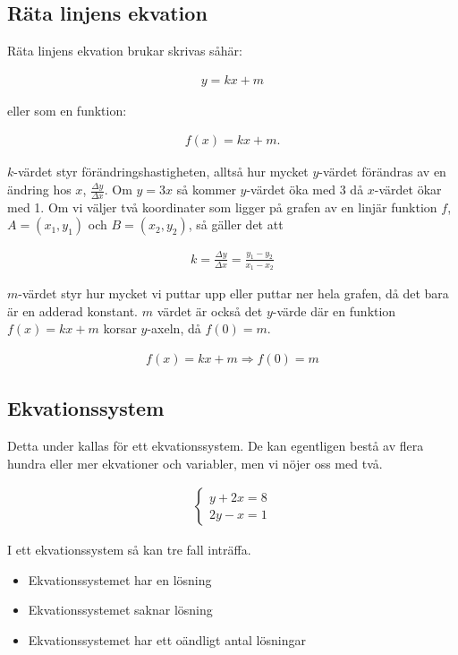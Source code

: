\newpage
\subsection{Räta linjens ekvation}

Räta linjens ekvation brukar skrivas såhär:

\begin{align}
	y=kx+m
\end{align}

eller som en funktion:

\begin{align}
	f(x)=kx+m.
\end{align}

$k$-värdet styr förändringshastigheten, alltså hur mycket $y$-värdet förändras av en ändring hos $x$, $\frac{\Delta y}{\Delta x}$. Om $y = 3x$ så kommer $y$-värdet öka med $3$ då $x$-värdet ökar med 1. Om vi väljer två koordinater som ligger på grafen av en linjär funktion $f$, $A=(x_1,y_1)$ och $B=(x_2,y_2)$, så gäller det att

\begin{align}
	k = \frac{\Delta y}{\Delta x} = \frac{y_1-y_2}{x_1-x_2}
\end{align}

$m$-värdet styr hur mycket vi puttar upp eller puttar ner hela grafen, då det bara är en adderad konstant. $m$ värdet är också det $y$-värde där en funktion $f(x)=kx+m$ korsar $y$-axeln, då $f(0)=m$.

\begin{align}
	f(x) = kx+m \Rightarrow f(0) = m
\end{align}

\subsection{Ekvationssystem}

Detta under kallas för ett ekvationssystem. De kan egentligen bestå av flera hundra eller mer ekvationer och variabler, men vi nöjer oss med två.

\begin{align}
	\begin{cases}
		y+2x=8 \\
		2y-x = 1
	\end{cases}
\end{align}

I ett ekvationssystem så kan tre fall inträffa. 

\begin{itemize}
	\item Ekvationssystemet har en lösning
	\item Ekvationssystemet saknar lösning
	\item Ekvationssystemet har ett oändligt antal lösningar
\end{itemize}

